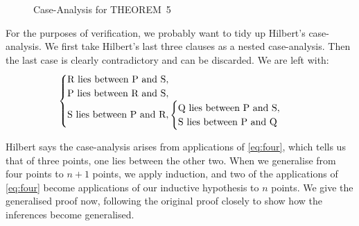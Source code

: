\begin{figure}
\caption{Case-Analysis for THEOREM~5}
\label{fig:Theorem5Cases}
\end{figure}

For the purposes of verification, we probably want to tidy up Hilbert's case-analysis. We first take Hilbert's last three clauses as a nested case-analysis. Then the last case is clearly contradictory and can be discarded. We are left with:
\begin{displaymath}
\begin{cases}
$R$ \text{ lies between } $P$ \text{ and } $S$,\\
$P$ \text{ lies between } $R$ \text{ and } $S$,\\
$S$ \text{ lies between } $P$ \text{ and } $R$,
\begin{cases}
  $Q$ \text{ lies between } $P$ \text{ and } $S$,\\
  $S$ \text{ lies between } $P$ \text{ and } $Q$
\end{cases}
\end{cases}
\end{displaymath}

Hilbert says the case-analysis arises from applications of \ref{eq:four}, which tells us that of three points, one lies between the other two. When we generalise from four points to $n+1$ points, we apply induction, and two of the applications of \ref{eq:four} become applications of our inductive hypothesis to $n$ points. We give the generalised proof now, following the original proof closely to show how the inferences become generalised.

